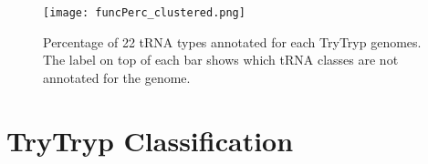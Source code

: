 \documentclass[table,
12pt, %
a4paper, %
oneside, %
headinclude,footinclude, %
BCOR5mm, %
]{scrartcl}
\begin{document}
\begin{figure}[tb]
  \centering
  \texttt{[image: funcPerc\_clustered.png]}
  \caption[Genome Comparison]{Percentage of 22 tRNA types annotated for each TryTryp genomes. The label on top of each bar shows which tRNA classes are not annotated for the genome.} %
  \label{fig:types}
\end{figure}
\section{TryTryp Classification}
\end{document}
